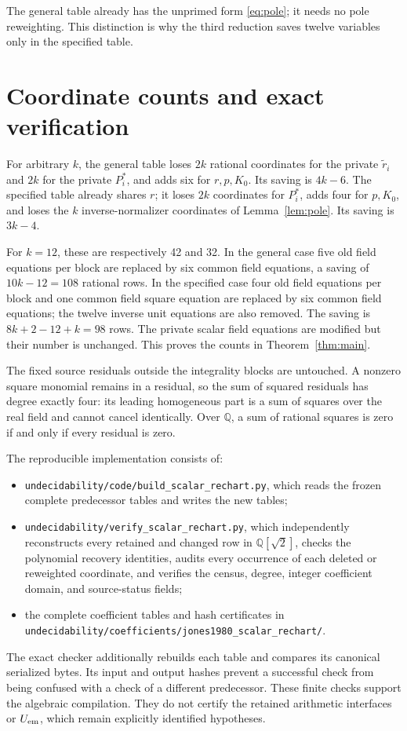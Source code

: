 \documentclass[11pt]{article}
\theoremstyle{remark}\newtheorem{remark}[theorem]{Remark}
\newcommand{\Q}{\mathbb Q}
\begin{document}
The general table already has the unprimed form
\eqref{eq:pole}; it needs no pole reweighting. This distinction is
why the third reduction saves twelve variables only in the
specified table.

\section{Coordinate counts and exact verification}

For arbitrary \(k\), the general table loses \(2k\) rational
coordinates for the private \(\widetilde r_i\) and \(2k\) for
the private \(P_i^*\), and adds six for \(r,p,K_0\). Its saving
is \(4k-6\). The specified table already shares \(r\); it loses
\(2k\) coordinates for \(P_i^*\), adds four for \(p,K_0\), and
loses the \(k\) inverse-normalizer coordinates of
Lemma~\ref{lem:pole}. Its saving is \(3k-4\).

For \(k=12\), these are respectively 42 and 32. In the general
case five old field equations per block are replaced by six common
field equations, a saving of \(10k-12=108\) rational rows. In the
specified case four old field equations per block and one common
field square equation are replaced by six common field equations;
the twelve inverse unit equations are also removed. The saving is
\(8k+2-12+k=98\) rows. The private scalar field equations are
modified but their number is unchanged. This proves the counts in
Theorem~\ref{thm:main}.

The fixed source residuals outside the integrality blocks are
untouched. A nonzero square monomial remains in a residual, so
the sum of squared residuals has degree exactly four: its leading
homogeneous part is a sum of squares over the real field and cannot
cancel identically. Over \(\Q\), a sum of rational squares is zero
if and only if every residual is zero.

The reproducible implementation consists of:
\begin{itemize}
\item
\nolinkurl{undecidability/code/build_scalar_rechart.py}, which reads
the frozen complete predecessor tables and writes the new tables;
\item
\nolinkurl{undecidability/verify_scalar_rechart.py}, which independently
reconstructs every retained and changed row in \(\Q[\sqrt2]\),
checks the polynomial recovery identities, audits every occurrence
of each deleted or reweighted coordinate, and verifies the census,
degree, integer coefficient domain, and source-status fields;
\item the complete coefficient tables and hash certificates in
\nolinkurl{undecidability/coefficients/jones1980_scalar_rechart/}.
\end{itemize}
The exact checker additionally rebuilds each table and compares its
canonical serialized bytes. Its input and output hashes prevent a
successful check from being confused with a check of a different
predecessor. These finite checks support the algebraic compilation.
They do not certify the retained arithmetic interfaces or
\(U_{\rm em}\), which remain explicitly identified hypotheses.
\end{document}
